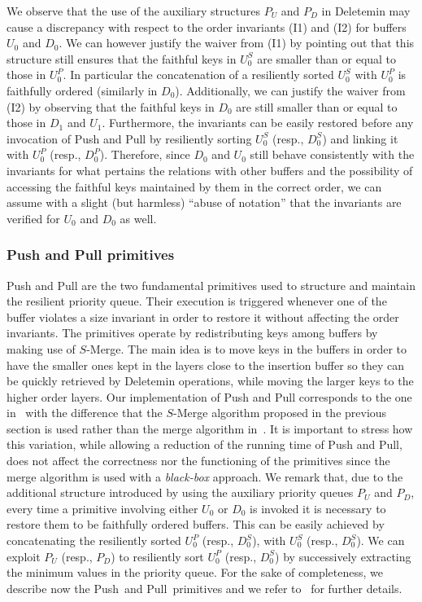 \documentclass[review,number]{elsarticle}
\newcommand{\SMerge}{$S$-\textsf{Merge}}
\newcommand{\Deletemin}{\textsf{Deletemin}}
\newcommand{\Push}{\textsf{Push}}
\newcommand{\Pull}{\textsf{Pull}}
\begin{document}
We observe that the use of the auxiliary structures $P_U$ and $P_D$ in
\Deletemin{} may cause a discrepancy with
respect to the order invariants (I1) and (I2) for buffers $U_{0}$ and $D_{0}$.
We can however justify the waiver from (I1) by pointing out that this
structure still ensures that the faithful keys in $U^{S}_{0}$ are smaller than
or equal to those in $U^{P}_{0}$. In particular the concatenation of a
resiliently sorted $U^{S}_{0}$ with $U^{P}_{0}$ is faithfully ordered
(similarly in $D_0$).
Additionally, we can justify the waiver from (I2) by
observing that the faithful keys in $D_{0}$
are still smaller than or equal to those in $D_{1}$ and $U_{1}$. Furthermore,
the invariants can be easily restored before any invocation of \Push{} and
\Pull{} by resiliently sorting $U^{S}_{0}$ (resp., $D^{S}_{0}$) and
linking it with $U^{P}_{0}$ (resp., $D^{P}_{0}$).
Therefore, since  $D_{0}$ and $U_{0}$ still behave
consistently with the invariants for what pertains the relations with other
buffers and the possibility of accessing the faithful keys maintained by them in
the correct order,  we can assume with a slight (but harmless) ``abuse of
notation'' that the invariants are verified for $U_{0}$ and $D_{0}$ as well. 


\subsubsection{\Push{} and \Pull{} primitives}\label{sec:pushpull}
\Push{} and \Pull{} are the two fundamental primitives used to structure and
maintain the resilient priority queue. Their execution is triggered whenever one
of the buffer violates a size invariant in order to restore it without affecting
the order invariants. The primitives operate by redistributing keys among
buffers by making use of \SMerge{}. The main idea is to move keys in the buffers
in order to have the smaller ones kept in the layers close to the insertion
buffer so they can be quickly retrieved by \Deletemin{} operations,  while
moving the larger keys to the higher order layers. Our implementation of \Push{}
and \Pull{} corresponds to the one in~\cite{JMM07} with the difference that the
\SMerge{} algorithm proposed in the previous section is used rather than the
merge algorithm in~\cite{FGI09}. It is important to stress how this variation,
while allowing a reduction of the running time of \Push{} and \Pull{}, does not
affect the correctness nor the functioning of the primitives since the merge
algorithm is used with a \emph{black-box} approach. We remark that, due to the
additional structure introduced by using the auxiliary priority queues $P_U$ and
$P_D$, every time a primitive involving either $U_0$ or $D_0$  is invoked it is
necessary to restore them to be faithfully ordered buffers. This can be easily
achieved by concatenating the resiliently sorted $U^P_0$ (resp., $D^S_0$), with
$U^S_0$ (resp., $D^S_0$). We can exploit $P_U$ (resp., $P_D$) to resiliently
sort  $U^P_0$ (resp., $D^S_0$) by successively extracting the minimum values in
the priority queue. For the sake of completeness, we describe now the \Push\ and
\Pull\ primitives and we refer to~\cite{JMM07} for further details.
\end{document}
